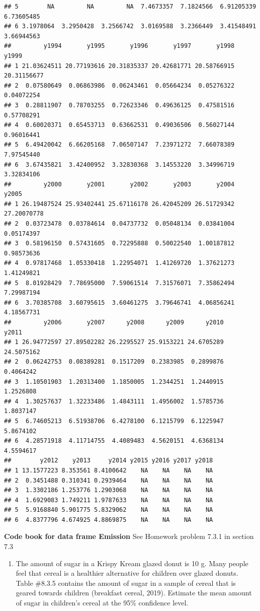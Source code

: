 \documentclass[
]{book}
\providecommand{\tightlist}{%
  \setlength{\itemsep}{0pt}\setlength{\parskip}{0pt}}
\begin{document}
\begin{verbatim}
## 5        NA         NA         NA  7.4673357  7.1824566  6.91205339  6.73605485
## 6 3.1978064  3.2950428  3.2566742  3.0169588  3.2366449  3.41548491  3.66944563
##         y1994       y1995       y1996       y1997       y1998       y1999
## 1 21.03624511 20.77193616 20.31835337 20.42681771 20.58766915 20.31156677
## 2  0.07580649  0.06863986  0.06243461  0.05664234  0.05276322  0.04072254
## 3  0.28811907  0.78703255  0.72623346  0.49636125  0.47581516  0.57708291
## 4  0.60020371  0.65453713  0.63662531  0.49036506  0.56027144  0.96016441
## 5  6.49420042  6.66205168  7.06507147  7.23971272  7.66078389  7.97545440
## 6  3.67435821  3.42400952  3.32830368  3.14553220  3.34996719  3.32834106
##         y2000       y2001       y2002       y2003       y2004       y2005
## 1 26.19487524 25.93402441 25.67116178 26.42045209 26.51729342 27.20070778
## 2  0.03723478  0.03784614  0.04737732  0.05048134  0.03841004  0.05174397
## 3  0.58196150  0.57431605  0.72295888  0.50022540  1.00187812  0.98573636
## 4  0.97817468  1.05330418  1.22954071  1.41269720  1.37621273  1.41249821
## 5  8.01928429  7.78695000  7.59061514  7.31576071  7.35862494  7.29987194
## 6  3.70385708  3.60795615  3.60461275  3.79646741  4.06856241  4.18567731
##         y2006       y2007      y2008      y2009      y2010      y2011
## 1 26.94772597 27.89502282 26.2295527 25.9153221 24.6705289 24.5075162
## 2  0.06242753  0.08389281  0.1517209  0.2383985  0.2899876  0.4064242
## 3  1.10501903  1.20313400  1.1850005  1.2344251  1.2440915  1.2526808
## 4  1.30257637  1.32233486  1.4843111  1.4956002  1.5785736  1.8037147
## 5  6.74605213  6.51938706  6.4278100  6.1215799  6.1225947  5.8674102
## 6  4.28571918  4.11714755  4.4089483  4.5620151  4.6368134  4.5594617
##        y2012    y2013     y2014 y2015 y2016 y2017 y2018
## 1 13.1577223 8.353561 8.4100642    NA    NA    NA    NA
## 2  0.3451488 0.310341 0.2939464    NA    NA    NA    NA
## 3  1.3302186 1.253776 1.2903068    NA    NA    NA    NA
## 4  1.6929083 1.749211 1.9787633    NA    NA    NA    NA
## 5  5.9168840 5.901775 5.8329062    NA    NA    NA    NA
## 6  4.8377796 4.674925 4.8869875    NA    NA    NA    NA
\end{verbatim}

\textbf{Code book for data frame Emission} See Homework problem 7.3.1 in section 7.3

\begin{enumerate}
\def\labelenumi{\arabic{enumi}.}
\setcounter{enumi}{1}
\tightlist
\item
  The amount of sugar in a Krispy Kream glazed donut is 10 g. Many people feel that cereal is a healthier alternative for children over glazed donuts. Table \#8.3.5 contains the amount of sugar in a sample of cereal that is geared towards children (breakfast cereal, 2019). Estimate the mean amount of sugar in children's cereal at the 95\% confidence level.
\end{enumerate}
\end{document}
